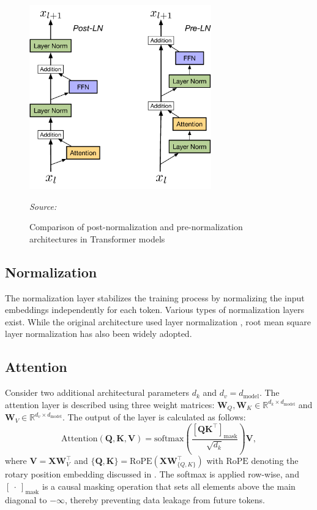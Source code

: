 \begin{figure}[ht]
    \centering
    \includegraphics[width=0.7\textwidth]{figures/post-vs-pre-norm.pdf}
    \caption{Comparison of post-normalization and pre-normalization architectures in Transformer models}\label{fig:post-vs-pre-norm}
    \hfill\textit{Source: \citet{ding2021}}
\end{figure}

\subsection{Normalization}

The normalization layer stabilizes the training process by normalizing the input embeddings independently for each token. Various types of normalization layers exist. While the original architecture used layer normalization \parencite{ba2016}, root mean square layer normalization \parencite{zhang2019} has also been widely adopted.

\subsection{Attention}

Consider two additional architectural parameters \(d_k\) and \(d_v = d_{\mathrm{model}}\). The attention layer is described using three weight matrices: \(\mathbf{W}_Q, \mathbf{W}_K \in \mathbb{R}^{d_k \times d_{\mathrm{model}}}\) and \(\mathbf{W}_V \in \mathbb{R}^{d_v \times d_{\mathrm{model}}}\). The output of the layer is calculated as follows:
\begin{equation}\label{eq:attention}
    \mathrm{Attention}(\mathbf{Q}, \mathbf{K}, \mathbf{V}) = \mathrm{softmax}\left(\frac{\left[\mathbf{QK}^\top\right]_{\mathrm{mask}}}{\sqrt{d_k}}\right)\mathbf{V},
\end{equation}
where \(\mathbf{V} = \mathbf{XW}_V^{\top}\) and \(\{\mathbf{Q}, \mathbf{K}\} = \mathrm{RoPE}(\mathbf{XW}_{\{Q, K\}}^\top)\) with \(\mathrm{RoPE}\) denoting the rotary position embedding discussed in . The softmax is applied row-wise, and \([\ \cdot \ ]_{\mathrm{mask}}\) is a causal masking operation that sets all elements above the main diagonal to \(-\infty\), thereby preventing data leakage from future tokens.

